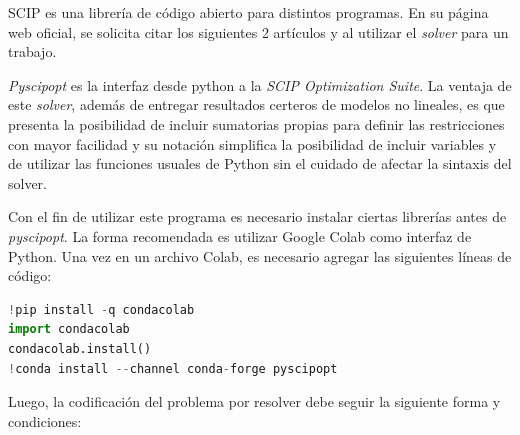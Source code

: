 SCIP es una librería de código abierto para distintos programas. En su página web oficial, se solicita citar los siguientes 2 artículos 
y  al utilizar el \textit{solver} para un trabajo. 
\vspace{2.5mm}

\textit{Pyscipopt} es la interfaz desde python a la \textit{SCIP Optimization Suite}. La ventaja de este \textit{solver}, además de entregar resultados certeros de modelos no lineales, es que presenta la posibilidad de incluir sumatorias propias para definir las restricciones con mayor facilidad y su notación simplifica la posibilidad de incluir variables y de utilizar las funciones usuales de Python sin el cuidado de afectar la sintaxis del solver.
\vspace{2.5mm}

Con el fin de utilizar este programa es necesario instalar ciertas librerías antes de \textit{pyscipopt}. La forma recomendada es utilizar Google Colab como interfaz de Python. Una vez en un archivo Colab, es necesario agregar las siguientes líneas de código:

\begin{footnotesize}
\begin{lstlisting}[language=Python]
!pip install -q condacolab
import condacolab            
condacolab.install()
!conda install --channel conda-forge pyscipopt
\end{lstlisting}
\end{footnotesize}

 
Luego, la codificación del problema por resolver debe seguir la siguiente forma y condiciones:

